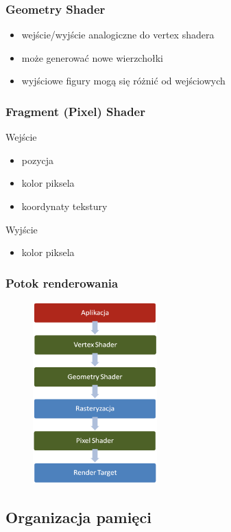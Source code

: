 \documentclass{beamer}
\begin{document}
\frame
{
	\frametitle{Geometry Shader}

	\begin{itemize}
	\item wejście/wyjście analogiczne do vertex shadera
	\item może generować nowe wierzchołki
	\item wyjściowe figury mogą się różnić od wejściowych
	\end{itemize}
}

\frame
{
	\frametitle{Fragment (Pixel) Shader}

	\begin{block}{Wejście}
	\begin{itemize}
	\item pozycja
	\item kolor piksela
	\item koordynaty tekstury
	\end{itemize}
	\end{block}
	\begin{block}{Wyjście}
	\begin{itemize}
	\item kolor piksela
	\end{itemize}
	\end{block}
}

\frame
{
	\frametitle{Potok renderowania}
	\begin{figure}
	\centering
	\includegraphics[height=7cm]{img/potok.png}
	\label{fig:potok}
	\end{figure}

}

\subsection{Organizacja pamięci}\label{sub:organizacja pamięci}
\end{document}
